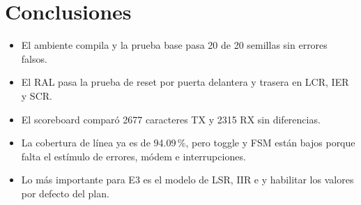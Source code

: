 \documentclass[11pt,a4paper]{article}
\begin{document}
\section{Conclusiones}
\begin{itemize}
\item El ambiente compila y la prueba base pasa 20 de 20 semillas sin errores falsos.
\item El RAL pasa la prueba de reset por puerta delantera y trasera en LCR, IER y SCR.
\item El scoreboard comparó 2677 caracteres TX y 2315 RX sin diferencias.
\item La cobertura de línea ya es de 94.09\,\%, pero toggle y FSM están bajos porque falta el estímulo de errores, módem e interrupciones.
\item Lo más importante para E3 es el modelo de LSR, IIR e  y habilitar los valores por defecto del plan.
\end{itemize}
\end{document}
